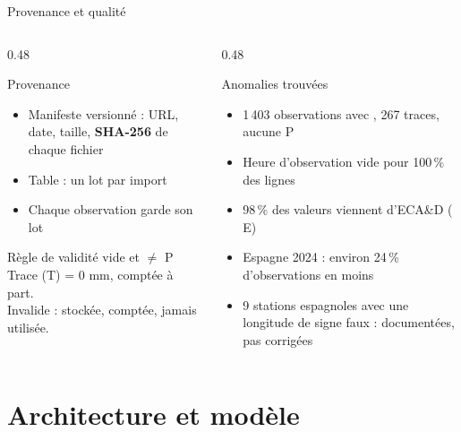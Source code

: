 \documentclass[aspectratio=169]{pres}
\begin{document}
\begin{frame}{Provenance et qualité}
  \begin{columns}[T]
    \begin{column}{0.48\textwidth}
      \begin{block}{Provenance}
        \begin{itemize}
          \item Manifeste versionné : URL, date, taille, \textbf{SHA-256} de chaque fichier
          \item Table  : un lot par import
          \item Chaque observation garde son lot
        \end{itemize}
      \end{block}
      \begin{block}{Règle de validité}
         vide et  $\neq$ P\\[0.2em]
        \small Trace (T) = 0 mm, comptée à part.\\
        Invalide : stockée, comptée, jamais utilisée.
      \end{block}
    \end{column}
    \begin{column}{0.48\textwidth}
      \begin{block}{Anomalies trouvées}
        \small
        \begin{itemize}
          \item 1\,403 observations avec , 267 traces, aucune P
          \item Heure d'observation vide pour 100\,\% des lignes
          \item 98\,\% des valeurs viennent d'ECA\&D ( E)
          \item Espagne 2024 : environ 24\,\% d'observations en moins
          \item 9 stations espagnoles avec une longitude de signe faux : documentées, pas corrigées
        \end{itemize}
      \end{block}
    \end{column}
  \end{columns}
\end{frame}

\section{Architecture et modèle}
\end{document}
